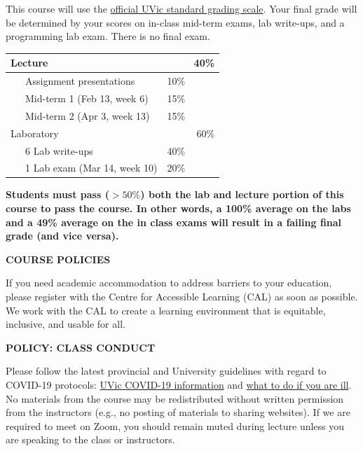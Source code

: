 \documentclass[11pt]{article}
\begin{document}
This course will use the \href{https://www.uvic.ca/calendar/future/undergrad/index.php#/policy/S1AAgoGuV?bc=true&bcCurrent=14%20-%20Grading&bcGroup=Undergraduate%20Academic%20Regulations&bcItemType=policies}{official UVic standard grading scale}. Your final grade will be determined by your scores on in-class mid-term exams, lab write-ups, and a programming lab exam. There is no final exam.

\begin{center}
		\begin{tabular}{ lr }
			Lecture                     & 40\%       \\
			\hline
			~~~Assignment presentations  & 10\%~~~~~~ \\
			~~~Mid-term 1 (Feb 13, week 6)  & 15\%~~~~~~ \\
			~~~Mid-term 2 (Apr 3, week 13)  & 15\%~~~~~~ \\
			Laboratory                  & 60\%       \\
			\hline
			~~~6 Lab write-ups    & 40\%~~~~~~  \\
			~~~1 Lab exam (Mar 14, week 10)    & 20\%~~~~~~  \\
		\end{tabular}
\end{center}

\textbf{Students must pass ($>50\%$) both the lab and lecture portion of this course to pass the course. In other words, a 100\% average on the labs and a 49\% average on the in class exams will result in a failing final grade (and vice versa).}

\clearpage

\begin{center}
  \textbf{COURSE POLICIES}
\end{center}

If you need academic accommodation to address barriers to your education, please register with the Centre for Accessible Learning (CAL) as soon as possible. We work with the CAL to create a learning environment that is equitable, inclusive, and usable for all.

\textbf{POLICY: CLASS CONDUCT}

Please follow the latest provincial and University guidelines with regard to COVID-19 protocols: \href{https://www.uvic.ca/covid19/index.php}{UVic COVID-19 information} and \href{https://www.uvic.ca/covid19/health-safety/index.php#ipn-if-you-re-sick}{what to do if you are ill}. No materials from the course may be redistributed without written permission from the instructors (e.g., no posting of materials to sharing websites). If we are required to meet on Zoom, you should remain muted during lecture unless you are speaking to the class or instructors.
\end{document}
